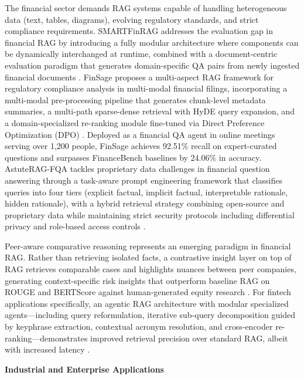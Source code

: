 \documentclass[11pt]{article}
\begin{document}
The financial sector demands RAG systems capable of handling heterogeneous data (text, tables, diagrams), evolving regulatory standards, and strict compliance requirements. SMARTFinRAG addresses the evaluation gap in financial RAG by introducing a fully modular architecture where components can be dynamically interchanged at runtime, combined with a document-centric evaluation paradigm that generates domain-specific QA pairs from newly ingested financial documents \cite{ref397}. FinSage proposes a multi-aspect RAG framework for regulatory compliance analysis in multi-modal financial filings, incorporating a multi-modal pre-processing pipeline that generates chunk-level metadata summaries, a multi-path sparse-dense retrieval with HyDE query expansion, and a domain-specialized re-ranking module fine-tuned via Direct Preference Optimization (DPO) \cite{ref398}. Deployed as a financial QA agent in online meetings serving over 1,200 people, FinSage achieves 92.51\% recall on expert-curated questions and surpasses FinanceBench baselines by 24.06\% in accuracy. AstuteRAG-FQA tackles proprietary data challenges in financial question answering through a task-aware prompt engineering framework that classifies queries into four tiers (explicit factual, implicit factual, interpretable rationale, hidden rationale), with a hybrid retrieval strategy combining open-source and proprietary data while maintaining strict security protocols including differential privacy and role-based access controls \cite{ref399}.

Peer-aware comparative reasoning represents an emerging paradigm in financial RAG. Rather than retrieving isolated facts, a contrastive insight layer on top of RAG retrieves comparable cases and highlights nuances between peer companies, generating context-specific risk insights that outperform baseline RAG on ROUGE and BERTScore against human-generated equity research \cite{ref565}. For fintech applications specifically, an agentic RAG architecture with modular specialized agents---including query reformulation, iterative sub-query decomposition guided by keyphrase extraction, contextual acronym resolution, and cross-encoder re-ranking---demonstrates improved retrieval precision over standard RAG, albeit with increased latency \cite{ref566}.

\textbf{Industrial and Enterprise Applications}
\end{document}
